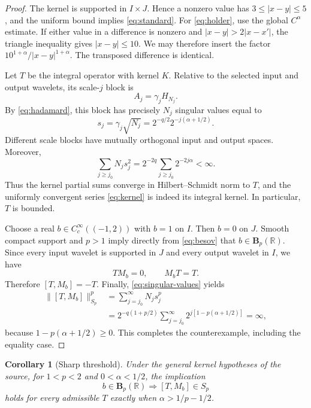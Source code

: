 \documentclass[11pt]{article}
\newtheorem{corollary}[theorem]{Corollary}
\theoremstyle{remark}
\newcommand{\R}{\mathbb R}
\begin{document}
\begin{proof}
The kernel is supported in $I\times J$.  Hence a nonzero value has
$3\leq|x-y|\leq5$, and the uniform bound implies \eqref{eq:standard}.
For \eqref{eq:holder}, use the global $C^\alpha$ estimate.  If either value
in a difference is nonzero and $|x-y|>2|x-x'|$, the triangle inequality
gives $|x-y|\leq10$.  We may therefore insert the factor
$10^{1+\alpha}/|x-y|^{1+\alpha}$.  The transposed difference is identical.

Let $T$ be the integral operator with kernel $K$.  Relative to the selected
input and output wavelets, its scale-$j$ block is
\[
                              A_j=\gamma_jH_{N_j}.
\]
By \eqref{eq:hadamard}, this block has precisely $N_j$ singular values equal
to
\begin{equation}\label{eq:singular-values}
 s_j=\gamma_j\sqrt{N_j}
     =2^{-q/2}2^{-j(\alpha+1/2)}.
\end{equation}
Different scale blocks have mutually orthogonal input and output spaces.
Moreover,
\[
 \sum_{j\geq j_0}N_js_j^2
 =2^{-2q}\sum_{j\geq j_0}2^{-2j\alpha}<\infty.
\]
Thus the kernel partial sums converge in Hilbert--Schmidt norm to $T$, and
the uniformly convergent series \eqref{eq:kernel} is indeed its integral
kernel.  In particular, $T$ is bounded.

Choose a real $b\in C_c^\infty((-1,2))$ with $b=1$ on $I$.  Then $b=0$ on
$J$.  Smooth compact support and $p>1$ imply directly from
\eqref{eq:besov} that $b\in\boldsymbol B_p(\R)$.  Since every input wavelet
is supported in $J$ and every output wavelet in $I$, we have
\[
                              TM_b=0,\qquad M_bT=T.
\]
Therefore $[T,M_b]=-T$.  Finally, \eqref{eq:singular-values} yields
\begin{align*}
 \|[T,M_b]\|_{S_p}^p
 &=\sum_{j=j_0}^\infty N_js_j^p\\
 &=2^{-q(1+p/2)}
   \sum_{j=j_0}^\infty
   2^{j[1-p(\alpha+1/2)]}=\infty,
\end{align*}
because $1-p(\alpha+1/2)\geq0$.  This completes the counterexample,
including the equality case.
\end{proof}

\begin{corollary}[Sharp threshold]\label{cor:threshold}
Under the general kernel hypotheses of the source, for $1<p<2$ and
$0<\alpha<1/2$, the implication
\[
                 b\in\boldsymbol B_p(\R)
                 \Longrightarrow [T,M_b]\in S_p
\]
holds for every admissible $T$ exactly when
$\alpha>1/p-1/2$.
\end{corollary}
\end{document}
